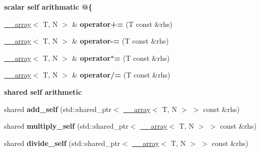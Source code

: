\begin{Indent}{\bf scalar self arithmatic @\{}\par
{\em \label{_amgrp7095cbd4de7cb27ceb837c23324bbb90}
 }\begin{DoxyCompactItemize}
\item 
\hypertarget{class____array_ab7e070d91093ec916a8f53724aa4e878}{
\hyperlink{class____array}{\_\-\_\-array}$<$ T, N $>$ \& {\bfseries operator+=} (T const \&rhs)}
\label{class____array_ab7e070d91093ec916a8f53724aa4e878}

\item 
\hypertarget{class____array_a551523046f30647b3591776040c64c50}{
\hyperlink{class____array}{\_\-\_\-array}$<$ T, N $>$ \& {\bfseries operator-\/=} (T const \&rhs)}
\label{class____array_a551523046f30647b3591776040c64c50}

\item 
\hypertarget{class____array_abf242f49019b906d3f846fc185cc38ae}{
\hyperlink{class____array}{\_\-\_\-array}$<$ T, N $>$ \& {\bfseries operator$\ast$=} (T const \&rhs)}
\label{class____array_abf242f49019b906d3f846fc185cc38ae}

\item 
\hypertarget{class____array_ad0a349749a91dc7379c626dc13b6f26c}{
\hyperlink{class____array}{\_\-\_\-array}$<$ T, N $>$ \& {\bfseries operator/=} (T const \&rhs)}
\label{class____array_ad0a349749a91dc7379c626dc13b6f26c}

\end{DoxyCompactItemize}
\end{Indent}
\begin{Indent}{\bf shared self arithmetic}\par
{\em \label{_amgrp0ebedd0318bf343b5e17c1deddd1521f}
 }\begin{DoxyCompactItemize}
\item 
\hypertarget{class____array_ab98796270b9e65a78d5d9eda70c66ef9}{
shared {\bfseries add\_\-self} (std::shared\_\-ptr$<$ \hyperlink{class____array}{\_\-\_\-array}$<$ T, N $>$ $>$ const \&rhs)}
\label{class____array_ab98796270b9e65a78d5d9eda70c66ef9}

\item 
\hypertarget{class____array_a34920f8760f31932fa0b7134ad852fe3}{
shared {\bfseries multiply\_\-self} (std::shared\_\-ptr$<$ \hyperlink{class____array}{\_\-\_\-array}$<$ T, N $>$ $>$ const \&rhs)}
\label{class____array_a34920f8760f31932fa0b7134ad852fe3}

\item 
\hypertarget{class____array_a99892174a079f472bcd3f95621e5b18e}{
shared {\bfseries divide\_\-self} (std::shared\_\-ptr$<$ \hyperlink{class____array}{\_\-\_\-array}$<$ T, N $>$ $>$ const \&rhs)}
\label{class____array_a99892174a079f472bcd3f95621e5b18e}

\end{DoxyCompactItemize}
\end{Indent}
